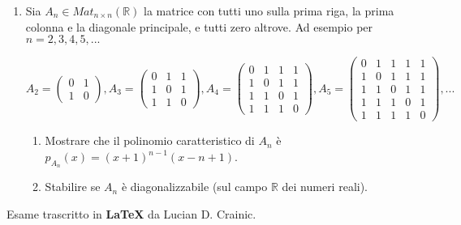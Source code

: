 \documentclass[fleqn]{article}
\begin{document}
\begin{enumerate}
   \item Sia $A_n \in Mat_{n \times n}(\mathbb{R})$ la matrice con tutti uno sulla prima riga, la prima colonna
   e la diagonale principale, e tutti zero altrove. Ad esempio per $n=2,3,4,5,...$
   \begin{center}
   $
   A_2 = \begin{pmatrix}
         0 & 1 \\
         1 & 0
      \end{pmatrix},
   A_3 = \begin{pmatrix}
       0 & 1 & 1 \\
       1 & 0 & 1 \\
       1 & 1 & 0 
    \end{pmatrix},
   A_4 = \begin{pmatrix}
       0 & 1 & 1 & 1\\
       1 & 0 & 1 & 1  \\
       1 & 1 & 0 & 1 \\
       1 & 1 & 1 & 0 
    \end{pmatrix},
   A_5 = \begin{pmatrix}
       0 & 1 & 1 & 1 & 1\\
       1 & 0 & 1 & 1 & 1 \\
       1 & 1 & 0 & 1 & 1 \\
       1 & 1 & 1 & 0 & 1 \\
       1 & 1 & 1 & 1 & 0
    \end{pmatrix},
    ...
   $
   \end{center}

   \begin{enumerate}
      \item Mostrare che il polinomio caratteristico di $A_n$ è $p_{A_n}(x) = (x+1)^{n-1}(x-n+1)$.
      \item Stabilire se $A_n$ è diagonalizzabile (sul campo $\mathbb{R}$ dei numeri reali).
   \end{enumerate}

\end{enumerate}
Esame trascritto in \textbf{\LaTeX} da Lucian D. Crainic.
\end{document}

